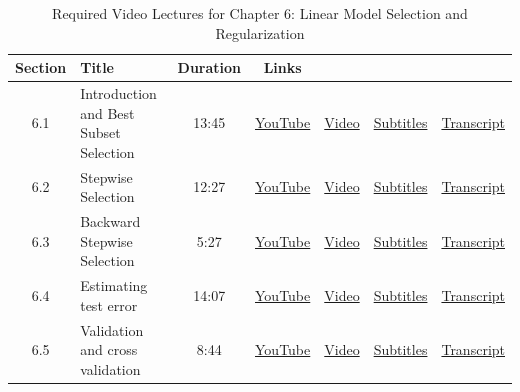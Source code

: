 \documentclass{article}
\begin{document}
\begin{table}
  \centering
  \caption{Required Video Lectures for Chapter 6: Linear Model Selection and Regularization}
  \label{tab:videos}
  \begin{tabular}{c l c c c c c}
    \toprule
      Section & Title & Duration & Links & & & \\
    \midrule
      6.1 & Introduction and Best Subset Selection & 13:45 &
      \href{https://youtu.be/nsv5rEV3mVI?si=l85FAQRbUhYeuaQ0}{YouTube} &
      \href{https://drive.google.com/drive/folders/1nqH4_lnJA7RIghWuMf0VKDTElWQlDkc3?usp=sharing}{Video} &
      \href{https://drive.google.com/drive/folders/1nqH4_lnJA7RIghWuMf0VKDTElWQlDkc3?usp=sharing}{Subtitles} &
      \href{https://drive.google.com/drive/folders/1nqH4_lnJA7RIghWuMf0VKDTElWQlDkc3?usp=sharing}{Transcript} \\
      6.2 & Stepwise Selection & 12:27 &
      \href{https://youtu.be/ynXq-Gw1xfE?si=MTcilvJexgyJULhq}{YouTube} &
      \href{https://drive.google.com/drive/folders/1nqH4_lnJA7RIghWuMf0VKDTElWQlDkc3?usp=sharing}{Video} &
      \href{https://drive.google.com/drive/folders/1nqH4_lnJA7RIghWuMf0VKDTElWQlDkc3?usp=sharing}{Subtitles} &
      \href{https://drive.google.com/drive/folders/1nqH4_lnJA7RIghWuMf0VKDTElWQlDkc3?usp=sharing}{Transcript} \\
      6.3 & Backward Stepwise Selection & 5:27 &
      \href{https://youtu.be/c5aI9cowjRI?si=G60SfaXBt6DU2FxT}{YouTube} &
      \href{https://drive.google.com/drive/folders/1nqH4_lnJA7RIghWuMf0VKDTElWQlDkc3?usp=sharing}{Video} &
      \href{https://drive.google.com/drive/folders/1nqH4_lnJA7RIghWuMf0VKDTElWQlDkc3?usp=sharing}{Subtitles} &
      \href{https://drive.google.com/drive/folders/1nqH4_lnJA7RIghWuMf0VKDTElWQlDkc3?usp=sharing}{Transcript} \\
      6.4 & Estimating test error & 14:07 &
      \href{https://youtu.be/48P-oV6cH44?si=OMwV3cCBfeSiSZl7}{YouTube} &
      \href{https://drive.google.com/drive/folders/1nqH4_lnJA7RIghWuMf0VKDTElWQlDkc3?usp=sharing}{Video} &
      \href{https://drive.google.com/drive/folders/1nqH4_lnJA7RIghWuMf0VKDTElWQlDkc3?usp=sharing}{Subtitles} &
      \href{https://drive.google.com/drive/folders/1nqH4_lnJA7RIghWuMf0VKDTElWQlDkc3?usp=sharing}{Transcript} \\
      6.5 & Validation and cross validation & 8:44 &
      \href{https://youtu.be/mzb5Xs58bb0?si=RNIM797vRbxlgyex}{YouTube} &
      \href{https://drive.google.com/drive/folders/1nqH4_lnJA7RIghWuMf0VKDTElWQlDkc3?usp=sharing}{Video} &
      \href{https://drive.google.com/drive/folders/1nqH4_lnJA7RIghWuMf0VKDTElWQlDkc3?usp=sharing}{Subtitles} &
      \href{https://drive.google.com/drive/folders/1nqH4_lnJA7RIghWuMf0VKDTElWQlDkc3?usp=sharing}{Transcript} \\
    \bottomrule
  \end{tabular}
\end{table}
\end{document}
